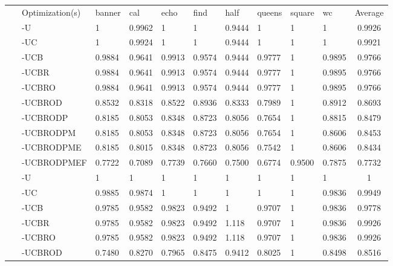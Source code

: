 \documentclass[10pt]{article}
\theoremstyle{remark}
\begin{document}
	\begin{tabular}{cl||l|l|l|l|l|l|l|l||c}
		~ & Optimization(s) & banner & cal & echo & find & half & queens & square & wc & Average \\ \hhline{~==========}
		\multirow{10}{*}{\rotatebox[origin=c]{90}{\parbox[c]{4cm}{\centering \large Static Instructions }}} & -U & 1 & 0.9962 & 1 & 1 & 0.9444 & 1 & 1 & 1 & 0.9926 \\ \cline{2-11}
		~ & -UC & 1 & 0.9924 & 1 & 1 & 0.9444 & 1 & 1 & 1 & 0.9921 \\ \cline{2-11}
		~ & -UCB & 0.9884 & 0.9641 & 0.9913 & 0.9574 & 0.9444 & 0.9777 & 1 & 0.9895 & 0.9766 \\ \cline{2-11}
		~ & -UCBR & 0.9884 & 0.9641 & 0.9913 & 0.9574 & 0.9444 & 0.9777 & 1 & 0.9895 & 0.9766 \\ \cline{2-11}
		~ & -UCBRO & 0.9884 & 0.9641 & 0.9913 & 0.9574 & 0.9444 & 0.9777 & 1 & 0.9895 & 0.9766 \\ \cline{2-11}
		~ & -UCBROD & 0.8532 & 0.8318 & 0.8522 & 0.8936 & 0.8333 & 0.7989 & 1 & 0.8912 & 0.8693 \\ \cline{2-11}
		~ & -UCBRODP & 0.8185 & 0.8053 & 0.8348 & 0.8723 & 0.8056 & 0.7654 & 1 & 0.8815 & 0.8479 \\ \cline{2-11}
		~ & -UCBRODPM & 0.8185 & 0.8053 & 0.8348 & 0.8723 & 0.8056 & 0.7654 & 1 & 0.8606 & 0.8453 \\ \cline{2-11}
		~ & -UCBRODPME & 0.8185 & 0.8015 & 0.8348 & 0.8723 & 0.8056 & 0.7542 & 1 & 0.8606 & 0.8434 \\ \cline{2-11}
		~ & -UCBRODPMEF & 0.7722 & 0.7089 & 0.7739 & 0.7660 & 0.7500 & 0.6774 & 0.9500 & 0.7875 & 0.7732 \\ \hline \hline
		\multirow{10}{*}{\rotatebox[origin=c]{90}{\parbox[c]{4cm}{\centering \large Dynamic Instructions }}} & -U & 1 & 1 & 1 & 1 & 1 & 1 & 1 & 1 & 1 \\ \cline{2-11}
		~ & -UC & 0.9885 & 0.9874 & 1 & 1 & 1 & 1 & 1 & 0.9836 & 0.9949 \\ \cline{2-11}
		~ & -UCB & 0.9785 & 0.9582 & 0.9823 & 0.9492 & 1 & 0.9707 & 1 & 0.9836 & 0.9778 \\ \cline{2-11}
		~ & -UCBR & 0.9785 & 0.9582 & 0.9823 & 0.9492 & 1.118 & 0.9707 & 1 & 0.9836 & 0.9926 \\ \cline{2-11}
		~ & -UCBRO & 0.9785 & 0.9582 & 0.9823 & 0.9492 & 1.118 & 0.9707 & 1 & 0.9836 & 0.9926 \\ \cline{2-11}
		~ & -UCBROD & 0.7480 & 0.8270 & 0.7965 & 0.8475 & 0.9412 & 0.8025 & 1 & 0.8498 & 0.8516 \\ \cline{2-11}

\end{tabular}
\end{document}
